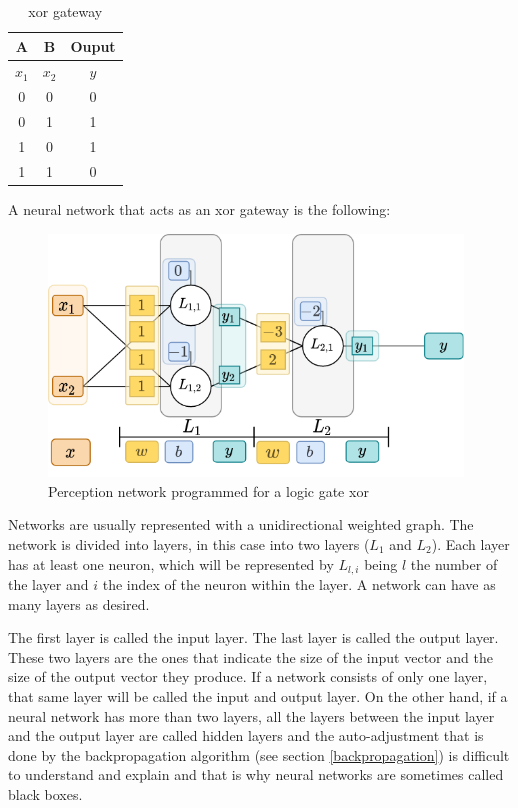 \begin{table}[H]
\centering
\begin{tabular}{| c | c | c |}
\hline
A & B & Ouput \\
\hline
$x_1$ & $x_2$ & $y$ \\
\hline
0 & 0 & 0 \\
0 & 1 & 1\\
1 & 0 & 1\\
1 & 1 & 0\\
\hline
\end{tabular}
\caption{\acrshort{xor} gateway}
\end{table}

A neural network that acts as an \acrshort{xor} gateway is the following:
\begin{figure}[H]
    \centering
    \includegraphics[width=11cm]{images/state-of-art/perceptron/xor.png}
    \caption{Perception network programmed for a logic gate \acrshort{xor}}
    \label{fig:xorgatenetwork}
\end{figure}

\newline
Networks are usually represented with a unidirectional weighted graph. The network is divided into layers, in this case into two layers ($L_1$ and $L_2$). Each layer has at least one neuron, which will be represented by $L_{l,i}$ being $l$ the number of the layer and $i$ the index of the neuron within the layer. A network can have as many layers as desired.
\newline


The first layer is called the input layer. The last layer is called the output layer. These two layers are the ones that indicate the size of the input vector and the size of the output vector they produce. If a network consists of only one layer, that same layer will be called the input and output layer. On the other hand, if a neural network has more than two layers, all the layers between the input layer and the output layer are called hidden layers and the auto-adjustment that is done by the backpropagation algorithm (see section \ref{backpropagation}) is difficult to understand and explain and that is why neural networks are sometimes called black boxes.
\newline


